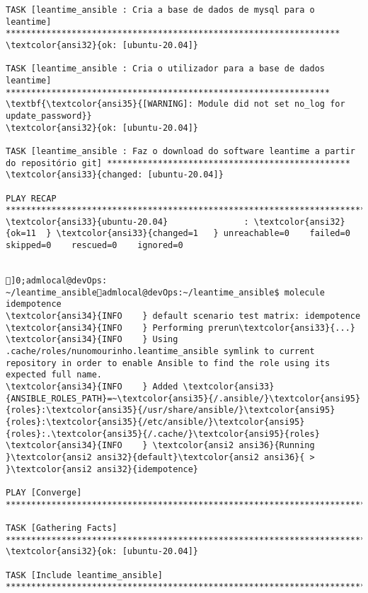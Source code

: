 \documentclass{scrartcl}
\begin{document}
\begin{Verbatim}
TASK [leantime_ansible : Cria a base de dados de mysql para o leantime] ******************************************************************
\textcolor{ansi32}{ok: [ubuntu-20.04]}

TASK [leantime_ansible : Cria o utilizador para a base de dados leantime] ****************************************************************
\textbf{\textcolor{ansi35}{[WARNING]: Module did not set no_log for update_password}}
\textcolor{ansi32}{ok: [ubuntu-20.04]}

TASK [leantime_ansible : Faz o download do software leantime a partir do repositório git] ************************************************
\textcolor{ansi33}{changed: [ubuntu-20.04]}

PLAY RECAP *******************************************************************************************************************************
\textcolor{ansi33}{ubuntu-20.04}               : \textcolor{ansi32}{ok=11  } \textcolor{ansi33}{changed=1   } unreachable=0    failed=0    skipped=0    rescued=0    ignored=0


]0;admlocal@devOps: ~/leantime_ansibleadmlocal@devOps:~/leantime_ansible$ molecule idempotence
\textcolor{ansi34}{INFO    } default scenario test matrix: idempotence
\textcolor{ansi34}{INFO    } Performing prerun\textcolor{ansi33}{...}
\textcolor{ansi34}{INFO    } Using .cache/roles/nunomourinho.leantime_ansible symlink to current repository in order to enable Ansible to find the role using its expected full name.
\textcolor{ansi34}{INFO    } Added \textcolor{ansi33}{ANSIBLE_ROLES_PATH}=~\textcolor{ansi35}{/.ansible/}\textcolor{ansi95}{roles}:\textcolor{ansi35}{/usr/share/ansible/}\textcolor{ansi95}{roles}:\textcolor{ansi35}{/etc/ansible/}\textcolor{ansi95}{roles}:.\textcolor{ansi35}{/.cache/}\textcolor{ansi95}{roles}
\textcolor{ansi34}{INFO    } \textcolor{ansi2 ansi36}{Running }\textcolor{ansi2 ansi32}{default}\textcolor{ansi2 ansi36}{ > }\textcolor{ansi2 ansi32}{idempotence}

PLAY [Converge] **************************************************************************************************************************

TASK [Gathering Facts] *******************************************************************************************************************
\textcolor{ansi32}{ok: [ubuntu-20.04]}

TASK [Include leantime_ansible] **********************************************************************************************************


\end{Verbatim}
\end{document}
